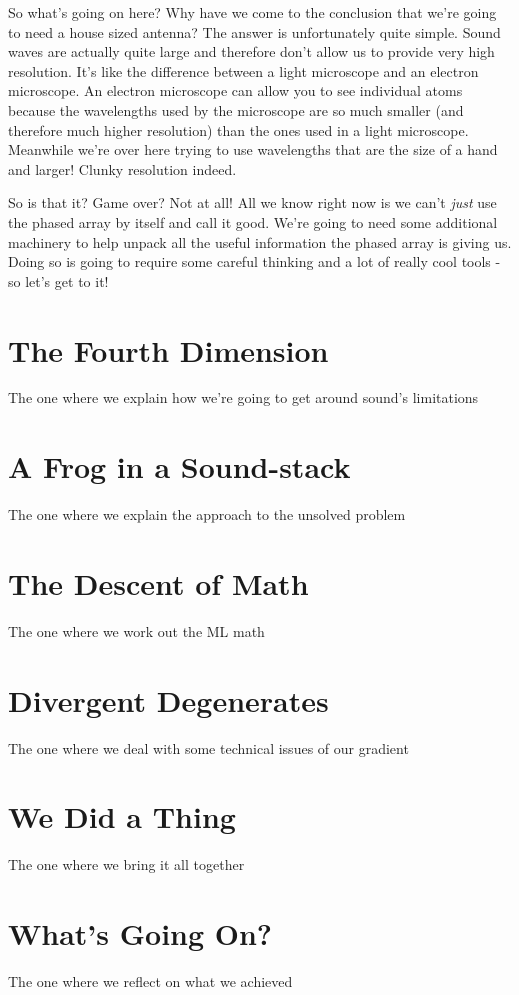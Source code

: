 \documentclass[10pt,a4paper]{article}
\begin{document}
So what's going on here? Why have we come to the conclusion that we're going to need a house sized antenna? The answer is unfortunately quite simple. Sound waves are actually quite large and therefore don't allow us to provide very high resolution. It's like the difference between a light microscope and an electron microscope. An electron microscope can allow you to see individual atoms because the wavelengths used by the microscope are so much smaller (and therefore much higher resolution) than the ones used in a light microscope. Meanwhile we're over here trying to use wavelengths that are the size of a hand and larger! Clunky resolution indeed. 

So is that it? Game over? Not at all! All we know right now is we can't \textit{just} use the phased array by itself and call it good. We're going to need some additional machinery to help unpack all the useful information the phased array is giving us. Doing so is going to require some careful thinking and a lot of really cool tools - so let's get to it!

\newpage


\section{The Fourth Dimension}
The one where we explain how we're going to get around sound's limitations
\section{A Frog in a Sound-stack}
The one where we explain the approach to the unsolved problem
\section{The Descent of Math}
The one where we work out the ML math
\section{Divergent Degenerates}
The one where we deal with some technical issues of our gradient
\section{We Did a Thing}
The one where we bring it all together
\section{What's Going On?}
The one where we reflect on what we achieved
\newpage


\end{document}
